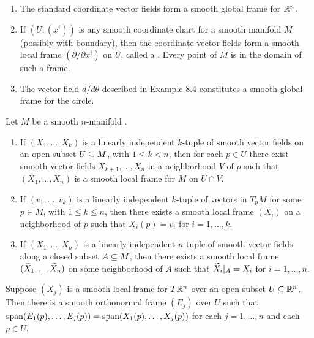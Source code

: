 \setcounter{thm}{9}

\begin{ex}\nl
\begin{enumerate}
    \item The standard coordinate vector fields form a smooth global frame for $\mathbb{R}^n$.
    \item If $(U,(x^i))$ is any smooth coordinate chart for a smooth manifold $M$ (possibly with boundary), then the coordinate vector fields form a smooth local frame $(\partial/\partial x^i)$ on $U$, called a . Every point of $M$ is in the domain of such a frame.
    \item The vector field $d/d\theta$ described in Example 8.4 constitutes a smooth global frame for the circle.
\end{enumerate}
\end{ex}

\begin{prop}
Let $M$ be a smooth $n$-manifold \wowob.
\begin{enumerate}
    \item If $(X_1,\ldots,X_k)$ is a linearly independent $k$-tuple of smooth vector fields on an open subset $U\subseteq M$, with $1\leq k < n$, then for each $p\in U$ there exist smooth vector fields $X_{k + 1},\ldots,X_n$ in a neighborhood $V$ of $p$ such that $(X_1,\ldots,X_n)$ is a smooth local frame for $M$ on $U\cap V$.
    \item If $(v_1,\ldots,v_k)$ is a linearly independent $k$-tuple of vectors in $T_pM$ for some $p\in M$, with $1\leq k\leq n$, then there exists a smooth local frame $(X_i)$ on a neighborhood of $p$ such that $X_i(p) = v_i$ for $i = 1,\ldots,k$.
    \item If $(X_1,\ldots,X_n)$ is a linearly independent $n$-tuple of smooth vector fields along a closed subset $A\subseteq M$, then there exists a smooth local frame $(\widetilde X_1,\ldots \widetilde X_n)$ on some neighborhood of $A$ such that $\widetilde X_i|_A = X_i$ for $i = 1,\ldots,n$.
\end{enumerate}
\end{prop}

\setcounter{thm}{12}

\begin{lem}
Suppose $(X_j)$ is a smooth local frame for $T\mathbb{R}^n$ over an open subset $U\subseteq \mathbb{R}^n$. Then there is a smooth orthonormal frame $(E_j)$ over $U$ such that $\text{span}(E_1(p),\ldots,E_j(p)) = \text{span}(X_1(p),\ldots,X_j(p))$ for each $j = 1,\ldots,n$ and each $p\in U$.
\end{lem}

